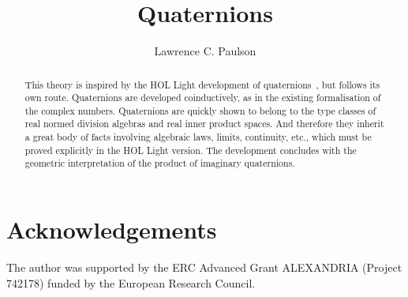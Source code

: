 \documentclass[11pt,a4paper]{article}
\begin{document}
\title{Quaternions}
\author{Lawrence C. Paulson}
\maketitle

\begin{abstract}
This theory is inspired by the HOL Light development of quaternions~\cite{gabrielli-quaternions}, but follows its own route. Quaternions are developed coinductively, as in the existing formalisation of the complex numbers. Quaternions are quickly shown to belong to the type classes of real normed division algebras and real inner product spaces. And therefore they inherit a great body of facts involving algebraic laws, limits, continuity, etc., which must be proved explicitly in the HOL Light version. The development concludes with the geometric interpretation of the product of imaginary quaternions.


\end{abstract}

\tableofcontents



\section{Acknowledgements}
The author was supported by the ERC Advanced Grant ALEXANDRIA (Project 742178) funded by the European Research Council.



\end{document}
